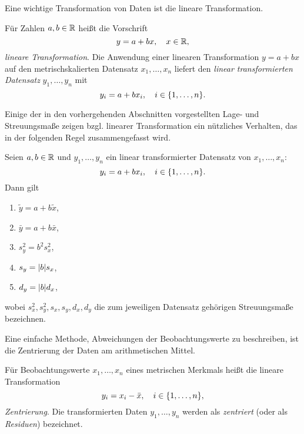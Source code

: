 \documentclass{lecture}
\begin{document}
    Eine wichtige Transformation von Daten ist die lineare Transformation.

    \begin{definition}
        Für Zahlen \(a, b \in \mathbb{R}\) heißt die Vorschrift
        \[
            y = a + bx, \quad x \in \mathbb{R},
        \]
        \emph{lineare Transformation}.
        Die Anwendung einer linearen Transformation \(y = a + bx\) auf den metrischskalierten Datensatz \(x_1, \ldots, x_n\) liefert den \emph{linear transformierten Datensatz} \(y_1, \ldots, y_n\) mit
        \[
            y_i = a + bx_i, \quad i \in \braces*{1, \ldots, n}.
        \]
    \end{definition}

    Einige der in den vorhergehenden Abschnitten vorgestellten Lage- und Streuungsmaße zeigen bzgl. linearer Transformation ein nützliches Verhalten, das in der folgenden Regel zusammengefasst wird.

    \begin{calcrule}
        Seien \(a, b \in \mathbb{R}\) und \(y_1, \ldots, y_n\) ein linear transformierter Datensatz von \(x_1, \ldots, x_n\):
        \[
            y_i = a + bx_i, \quad i \in \braces*{1, \ldots, n}.
        \]
        Dann gilt
        \begin{enumerate}
            \item \(\tilde{y} = a + b\tilde{x}\),
            \item \(\bar{y} = a + b\bar{x}\),
            \item \(s_y^2 = b^2 s_x^2\),
            \item \(s_y = \absolute*{b}s_x\),
            \item \(d_y = \absolute*{b}d_x\),
        \end{enumerate}
        wobei \(s_x^2, s_y^2, s_x, s_y, d_x, d_y\) die zum jeweiligen Datensatz gehörigen Streuungsmaße bezeichnen.
    \end{calcrule}

    Eine einfache Methode, Abweichungen der Beobachtungswerte zu beschreiben, ist die Zentrierung der Daten am arithmetischen Mittel.

    \begin{definition}
        Für Beobachtungswerte \(x_1, \ldots, x_n\) eines metrischen Merkmals heißt die lineare Transformation
        \[
            y_i = x_i - \bar{x}, \quad i \in \braces*{1, \ldots, n},
        \]
        \emph{Zentrierung}.
        Die transformierten Daten \(y_1, \ldots, y_n\) werden als \emph{zentriert} (oder als \emph{Residuen}) bezeichnet.
    \end{definition}
\end{document}
